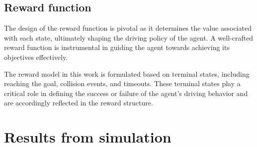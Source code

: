 
\subsection{Reward function}
The design of the reward function is pivotal as it determines the value associated with each state, ultimately shaping the driving policy of the agent. A well-crafted reward function is instrumental in guiding the agent towards achieving its objectives effectively.

The reward model in this work is formulated based on terminal states, including reaching the goal, collision events, and timeouts. These terminal states play a critical role in defining the success or failure of the agent's driving behavior and are accordingly reflected in the reward structure.



\section{Results from simulation}


